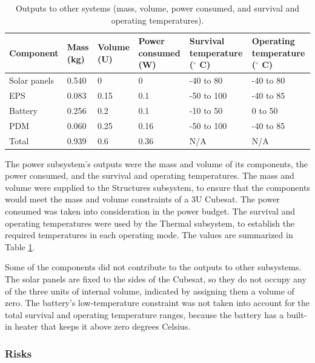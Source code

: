 \documentclass[12pt]{article}
\begin{document}
			

\begin{table}[ht]
\caption{Outputs to other systems (mass, volume, power consumed, and survival and operating temperatures).\cite[p.~9]{EPS-manual}\cite[p.~11,~21]{PDM-manual}\cite[p.~9]{Battery-manual}\cite[p.~2]{Solar-panel-datasheet}}
\label{tab:power-outputs}
\begin{center}
    \begin{tabular}{|l|l|l|p{0.8in}|p{1in}|p{1.1in}|} \hline
\textbf{Component} & \textbf{Mass (kg)} & \textbf{Volume (U)} & \textbf{Power consumed (W)} & \textbf{Survival temperature ($^\circ$ C)} & \textbf{Operating temperature ($^\circ$ C)} \\ \hline \hline
Solar panels & 0.540 & 0 & 0 & -40 to 80 & -40 to 80 \\\hline
EPS & 0.083 & 0.15 & 0.1 & -50 to 100 & -40 to 85 \\\hline
Battery & 0.256 & 0.2 & 0.1 & -10 to 50 & 0 to 50 \\\hline
PDM & 0.060 & 0.25 & 0.16 & -50 to 100 & -40 to 85 \\\hline \hline
Total & 0.939 & 0.6 & 0.36 & N/A & N/A \\\hline
    \end{tabular}
\end{center}
\end{table}

The power subsystem's outputs were the mass and volume of its components, the power consumed, and the survival and operating temperatures.  The mass and volume were supplied to the Structures subsystem, to ensure that the components would meet the mass and volume constraints of a 3U Cubesat.  The power consumed was taken into consideration in the power budget.  The survival and operating temperatures were used by the Thermal subsystem, to establish the required temperatures in each operating mode.  The values are summarized in Table \ref{tab:power-outputs}.

Some of the components did not contribute to the outputs to other subsystems.  The solar panels are fixed to the sides of the Cubesat, so they do not occupy any of the three units of internal volume, indicated by assigning them a volume of zero.  The battery's low-temperature constraint was not taken into account for the total survival and operating temperature ranges, because the battery has a built-in heater that keeps it above zero degrees Celsius.\cite[p.~12]{Battery-manual}

			\subsubsection{Risks}
\end{document}

